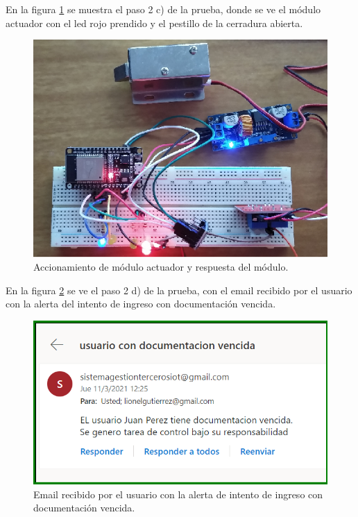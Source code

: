 En la figura \ref{fig:actuadorNOOK} se muestra el paso 2 c) de la prueba, donde se ve el módulo actuador con el led rojo prendido y el pestillo de la cerradura abierta.

\begin{figure}[ht]
	\centering
	\includegraphics[width=1\textwidth]{./Figures/actuadorNOOK.png}
	\caption{Accionamiento de módulo actuador y respuesta del módulo.}
	\label{fig:actuadorNOOK}
\end{figure}

\clearpage
En la figura \ref{fig:Email} se ve el paso 2 d) de la prueba, con el email recibido por el usuario con la alerta del intento de ingreso con documentación vencida.

\begin{figure}[ht]
	\centering
	\includegraphics[width=1\textwidth]{./Figures/email.png}
	\caption{Email recibido por el usuario con la alerta de intento de ingreso con documentación vencida.}
	\label{fig:Email}
\end{figure}

